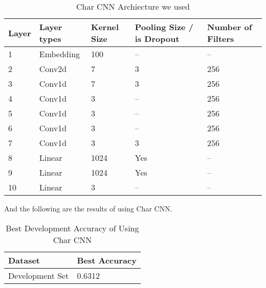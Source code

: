 \documentclass{article}
\begin{document}
\begin{table}[htb]
\caption{Char CNN Archiecture we used}
	\label{sample-table}
	\centering
\begin{tabular}{lllll}
\toprule
		\cmidrule{1-5}
		Layer & Layer types & Kernel Size & Pooling Size / is Dropout & Number of Filters 		\\
		\midrule
 			1 & Embedding & 100 & -- & -- \\
 			2 & Conv2d & 7 & 3 & 256 \\
 			3 & Conv1d & 7 & 3 & 256 \\
 			4 & Conv1d & 3 & -- & 256 \\
 			5 & Conv1d & 3 & -- & 256\\
 			6 & Conv1d & 3 & -- & 256 \\
 			7 & Conv1d & 3 & 3 & 256 \\
 			8 & Linear & 1024 & Yes & -- \\
 			9 & Linear & 1024 & Yes & -- \\
 			10 & Linear & 3 & -- & -- \\
\bottomrule
\end{tabular}
\end{table}

And the following are the results of using Char CNN. 

\begin{table}[htb]
	\caption{Best Development Accuracy of Using Char CNN}
	\label{sample-table}
	\centering
	\begin{tabular}{ll}
		\toprule
		\cmidrule{1-2}
		Dataset & Best Accuracy\\
		\midrule
		Development Set & 0.6312  \\
		\bottomrule
	\end{tabular}
\end{table}
\end{document}
